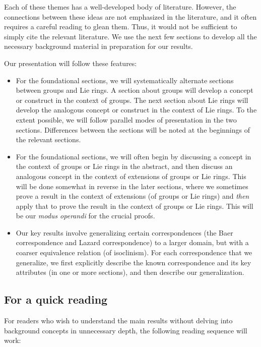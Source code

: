 Each of these themes has a well-developed body of literature. However,
the connections between these ideas are not emphasized in the
literature, and it often requires a careful reading to glean
them. Thus, it would not be sufficient to simply cite the relevant
literature. We use the next few sections to develop all the necessary
background material in preparation for our results.

Our presentation will follow these features:

\begin{itemize}
\item For the foundational sections, we will systematically alternate
  sections between groups and Lie rings. A section about groups will
  develop a concept or construct in the context of groups. The next
  section about Lie rings will develop the analogous concept or
  construct in the context of Lie rings. To the extent possible, we
  will follow parallel modes of presentation in the two
  sections. Differences between the sections will be noted at the
  beginnings of the relevant sections.
\item For the foundational sections, we will often begin by discussing
  a concept in the context of groups or Lie rings in the abstract, and
  then discuss an analogous concept in the context of extensions of
  groups or Lie rings. This will be done somewhat in reverse in the
  later sections, where we sometimes prove a result in the context of
  extensions (of groups or Lie rings) and {\em then} apply that to
  prove the result in the context of groups or Lie rings. This will be
  our {\em modus operandi} for the crucial proofs.
\item Our key results involve generalizing certain correspondences
  (the Baer correspondence and Lazard correspondence) to a larger
  domain, but with a coarser equivalence relation (of isoclinism). For
  each correspondence that we generalize, we first explicitly
  describe the known correspondence and its key attributes (in one
  or more sections), and then describe our generalization.
\end{itemize}

\subsection{For a quick reading}

For readers who wish to understand the main results without delving
into background concepts in unnecessary depth, the following reading
sequence will work:


